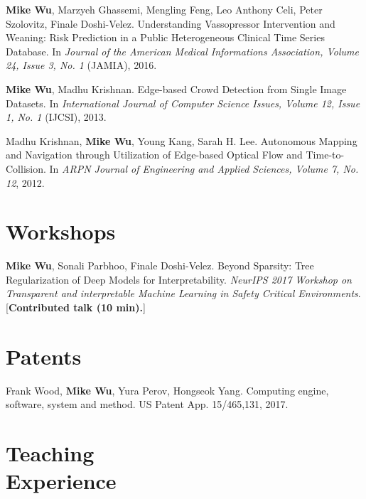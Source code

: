 \documentclass[margin, 10pt]{res} %
\begin{document}
\begin{resume}
\textbf{Mike Wu}, Marzyeh Ghassemi, Mengling Feng, Leo Anthony Celi, Peter Szolovitz, Finale Doshi-Velez. Understanding Vassopressor Intervention and Weaning: Risk Prediction in a Public Heterogeneous Clinical Time Series Database. In \textit{Journal of the American Medical Informations Association, Volume 24, Issue 3, No. 1} (JAMIA), 2016.

\textbf{Mike Wu}, Madhu Krishnan. Edge-based Crowd Detection from Single Image Datasets. In \textit{International Journal of Computer Science Issues, Volume 12, Issue 1, No. 1} (IJCSI), 2013.

Madhu Krishnan, \textbf{Mike Wu}, Young Kang, Sarah H. Lee. Autonomous Mapping and Navigation through Utilization of Edge-based Optical Flow and Time-to-Collision. In \textit{ARPN Journal of Engineering and Applied Sciences, Volume 7, No. 12}, 2012.

\section{Workshops}

\textbf{Mike Wu}, Sonali Parbhoo, Finale Doshi-Velez. Beyond Sparsity: Tree Regularization of Deep Models for Interpretability. \textit{NeurIPS 2017 Workshop on Transparent and interpretable Machine Learning in Safety Critical Environments}. [\textbf{Contributed talk (10 min).}]


\section{Patents}

Frank Wood, \textbf{Mike Wu}, Yura Perov, Hongseok Yang. Computing engine, software, system and method. US Patent App. 15/465,131, 2017.


\section{Teaching \\ Experience}


\end{resume}
\end{document}
